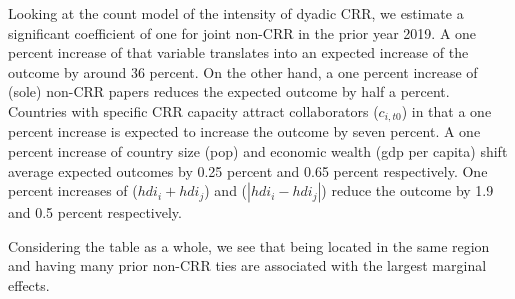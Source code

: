 Looking at the count model of the intensity of dyadic CRR, we estimate a significant coefficient of one for joint non-CRR in the prior year 2019. A one percent increase of that variable translates into an expected increase of the outcome by around 36 percent. On the other hand, a one percent increase of (sole) non-CRR papers reduces the expected outcome by half a percent. Countries with specific CRR capacity attract collaborators ($c_{i,t0}$) in that a one percent increase is expected to increase the outcome by seven percent. A one percent increase of country size (pop) and economic wealth (gdp per capita) shift average expected outcomes by 0.25 percent and 0.65 percent respectively. One percent increases of ($hdi_i + hdi_j$) and ($|hdi_i - hdi_j|$) reduce the outcome by 1.9 and 0.5 percent respectively. 

Considering the table as a whole, we see that being located in the same region and having many prior non-CRR ties are associated with the largest marginal effects. 

